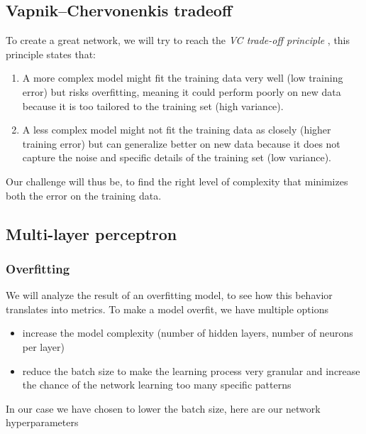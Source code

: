 \documentclass[a4paper, twocolumn, twoside]{article}
\begin{document}
    \subsection{Vapnik–Chervonenkis tradeoff}

	To create a great network, we will try to reach the \textit{VC trade-off principle} \cite{LeCun2019} \cite{vapnik1974theory},
	this principle states that:

	\begin{enumerate}
		\item A more complex model might fit the training data very well (low training error)
			but risks overfitting, meaning it could perform poorly on new data
			because it is too tailored to the training set (high variance).
		\item A less complex model might not fit the training data as closely 
			(higher training error) but can generalize better on new data because 
			it does not capture the noise and specific details of the training set (low variance).
	\end{enumerate}

	Our challenge will thus be, to find the right level of complexity that minimizes both the error on the training data.

	\subsection{Multi-layer perceptron}
        \subsubsection{Overfitting}
	   We will analyze the result of an overfitting model, to see 
	how this behavior translates into metrics. To make a model overfit, we have multiple options

	\begin{itemize}
		\item increase the model complexity (number of hidden layers, number of neurons per layer)
		\item reduce the batch size to make the learning process very granular 
			and increase the chance of the network learning too many specific patterns
	\end{itemize}

	In our case we have chosen to lower the batch size, here are our network hyperparameters
\end{document}
